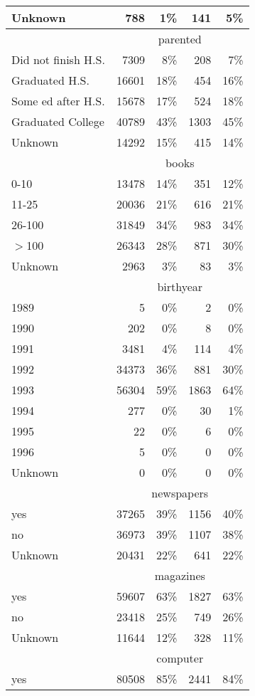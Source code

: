 \begin{longtable}{lrrrr}
  Unknown & 788 & 1\% & 141 & 5\% \\ 
   \hline & \multicolumn{4}{c}{parented} \\ \cline{2-5} Did not finish H.S. & 7309 & 8\% & 208 & 7\% \\ 
  Graduated H.S. & 16601 & 18\% & 454 & 16\% \\ 
  Some ed after H.S. & 15678 & 17\% & 524 & 18\% \\ 
  Graduated College & 40789 & 43\% & 1303 & 45\% \\ 
  Unknown & 14292 & 15\% & 415 & 14\% \\ 
   \hline & \multicolumn{4}{c}{books} \\ \cline{2-5} 0-10 & 13478 & 14\% & 351 & 12\% \\ 
  11-25 & 20036 & 21\% & 616 & 21\% \\ 
  26-100 & 31849 & 34\% & 983 & 34\% \\ 
  $>$100 & 26343 & 28\% & 871 & 30\% \\ 
  Unknown & 2963 & 3\% &  83 & 3\% \\ 
   \hline & \multicolumn{4}{c}{birthyear} \\ \cline{2-5} 1989 &   5 & 0\% &   2 & 0\% \\ 
  1990 & 202 & 0\% &   8 & 0\% \\ 
  1991 & 3481 & 4\% & 114 & 4\% \\ 
  1992 & 34373 & 36\% & 881 & 30\% \\ 
  1993 & 56304 & 59\% & 1863 & 64\% \\ 
  1994 & 277 & 0\% &  30 & 1\% \\ 
  1995 &  22 & 0\% &   6 & 0\% \\ 
  1996 &   5 & 0\% &   0 & 0\% \\ 
  Unknown &   0 & 0\% &   0 & 0\% \\ 
   \hline & \multicolumn{4}{c}{newspapers} \\ \cline{2-5} yes & 37265 & 39\% & 1156 & 40\% \\ 
  no & 36973 & 39\% & 1107 & 38\% \\ 
  Unknown & 20431 & 22\% & 641 & 22\% \\ 
   \hline & \multicolumn{4}{c}{magazines} \\ \cline{2-5} yes & 59607 & 63\% & 1827 & 63\% \\ 
  no & 23418 & 25\% & 749 & 26\% \\ 
  Unknown & 11644 & 12\% & 328 & 11\% \\ 
   \hline & \multicolumn{4}{c}{computer} \\ \cline{2-5} yes & 80508 & 85\% & 2441 & 84\% \\ 

\end{longtable}
